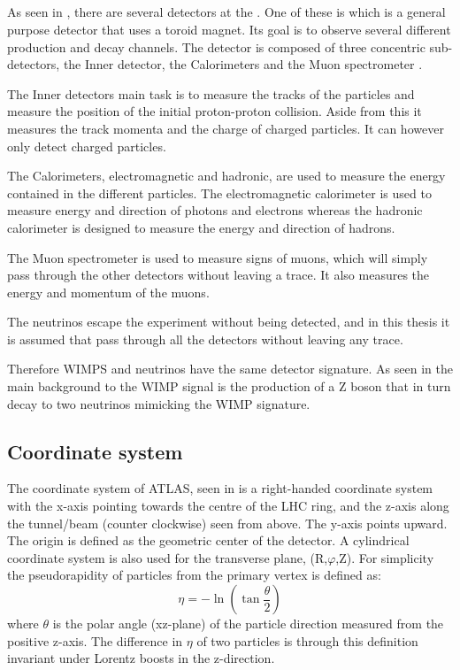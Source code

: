 \subsection{\abbrATLAS}\label{ATLAS}
As seen in , there are several detectors at the \abbrLHC. One of these is \abbrATLAS which is a general purpose detector that uses a toroid magnet. Its goal is to observe several different production and decay channels. The detector is composed of three concentric sub-detectors, the Inner detector, the Calorimeters and the Muon spectrometer \citep{1129811}.

The Inner detectors main task is to measure the tracks of the particles and measure the position of the initial proton-proton collision. Aside from this it measures the track momenta and the charge of charged particles. It can however only detect charged particles.

The Calorimeters, electromagnetic and hadronic, are used to measure the energy contained in the different particles. The electromagnetic calorimeter is used to measure energy and direction of photons and electrons whereas the hadronic calorimeter is designed to measure the energy and direction of hadrons.

The Muon spectrometer is used to measure signs of muons, which will simply pass through the other detectors without leaving a trace. It also measures the energy and momentum of the muons.

The neutrinos escape the \abbrATLAS experiment without being detected, and in this thesis it is assumed that \abbrWIMPS pass through all the detectors without leaving any trace.

Therefore WIMPS and neutrinos have the same detector signature. As seen in  the main background to the WIMP signal is the production of a Z boson that in turn decay to two neutrinos mimicking the WIMP signature.
\subsection{Coordinate system}\label{sec:eo:subsec:coord}
The coordinate system of ATLAS, seen in  is a right-handed coordinate system with the x-axis pointing towards the centre of the LHC ring, and the z-axis along the tunnel/beam (counter clockwise) seen from above. The y-axis points upward. The origin is defined as the geometric center of the detector. A cylindrical coordinate system is also used for the transverse plane, (R,$\varphi$,Z).
For simplicity the pseudorapidity of particles from the primary vertex is defined as:
\begin{equation}
\eta = - \ln( \tan\frac{\theta}{2})
\end{equation}
where $\theta$ is the polar angle (xz-plane) of the particle direction measured from the positive z-axis. The difference in $\eta$ of two particles is through this definition invariant under Lorentz boosts in the z-direction.


